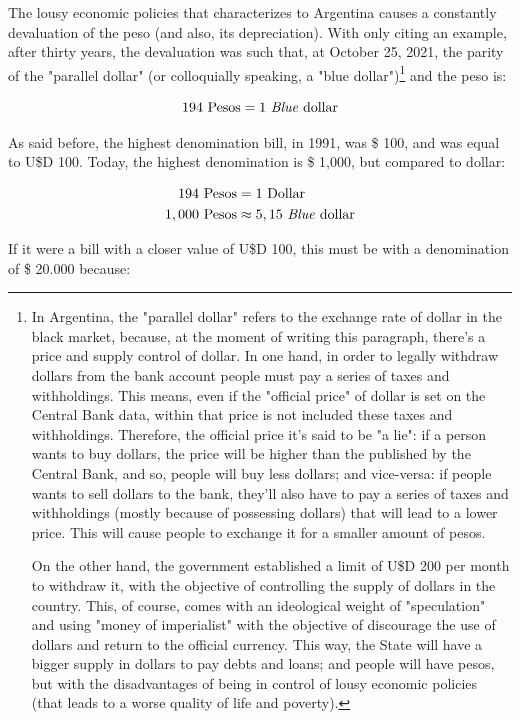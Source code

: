 \documentclass[12pt,a4paper,twoside]{book}
\begin{document}
The lousy economic policies that characterizes to Argentina causes a constantly devaluation of the peso (and also, its depreciation). With only citing an example, after thirty years, the devaluation was such that, at October 25, 2021, the parity of the "parallel dollar" (or colloquially speaking, a "blue dollar")\footnote{In Argentina, the "parallel dollar" refers to the exchange rate of dollar in the black market, because, at the moment of writing this paragraph, there's a price and supply control of dollar. In one hand, in order to legally withdraw dollars from the bank account people must pay a series of taxes and withholdings. This means, even if the "official price" of dollar is set on the Central Bank data, within that price is not included these taxes and withholdings. Therefore, the official price it's said to be "a lie": if a person wants to buy dollars, the price will be higher than the published by the Central Bank, and so, people will buy less dollars; and vice-versa: if people wants to sell dollars to the bank, they'll also have to pay a series of taxes and withholdings (mostly because of possessing dollars) that will lead to a lower price. This will cause people to exchange it for a smaller amount of pesos.

On the other hand, the government established a limit of U\$D 200 per month to withdraw it, with the objective of controlling the supply of dollars in the country. This, of course, comes with an ideological weight of "speculation" and using "money of imperialist" with the objective of discourage the use of dollars and return to the official currency. This way, the State will have a bigger supply in dollars to pay debts and loans; and people will have pesos, but with the disadvantages of being in control of lousy economic policies (that leads to a worse quality of life and poverty).} and the peso is:

\[
194 \text{ Pesos} = 1 \text{ \textit{Blue} dollar}
\]

As said before, the highest denomination bill, in 1991, was \$ 100, and was equal to U\$D 100. Today, the highest denomination is \$ 1,000, but compared to dollar:

\begin{align*}
194 \text{ Pesos} &= 1 \text{ Dollar} \\
1,000 \text{ Pesos} & \approx 5,15 \text{ \textit{Blue} dollar}
\end{align*}

If it were a bill with a closer value of U\$D 100, this must be with a denomination of \$ 20.000 because:
\end{document}

